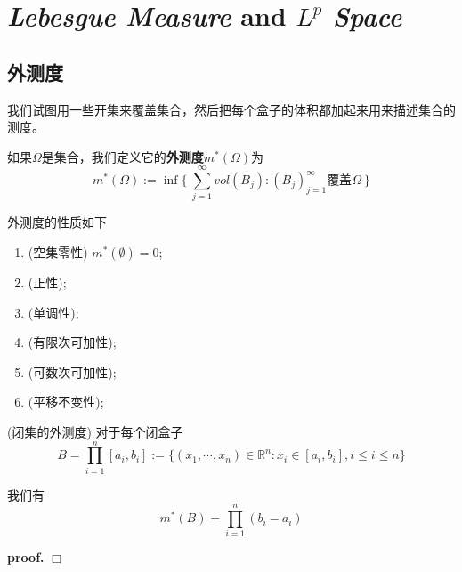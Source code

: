 \chapter{\textsl{Lebesgue Measure} and $L^p$ \textsl{Space}}

\section{外测度}

我们试图用一些开集来覆盖集合，然后把每个盒子的体积都加起来用来描述集合的测度。

\begin{mdframed}
    \begin{define}
        如果$\Omega$是集合，我们定义它的\textbf{外测度}$m^*(\Omega)$为
        \begin{equation}
            m^*(\Omega):=\inf\{\ \sum_{j=1}^{\infty}vol(B_j) : (B_j)_{j=1}^{\infty}\mbox{覆盖}\Omega \ \}
        \end{equation}
    \end{define}
\end{mdframed}

外测度的性质如下
\begin{enumerate}[itemindent=2em]
    \item (空集零性) $m^*(\emptyset)=0$;
    \item (正性);
    \item (单调性);
    \item (有限次可加性);
    \item (可数次可加性);
    \item (平移不变性);
\end{enumerate}

\begin{mdframed}
    \begin{proposition}
        (闭集的外测度) 对于每个闭盒子
        \begin{equation}
            B=\prod_{i=1}^{n}[a_i,b_i]:=\{(x_1,\cdots,x_n)\in \mathbb{R}^n:x_i\in [a_i,b_i],i\leqslant i\leqslant n\}
        \end{equation}

        我们有
        \begin{equation}
            m^*(B)=\prod_{i=1}^{n}(b_i-a_i)
        \end{equation}
    \end{proposition}
\end{mdframed}

\textbf{proof.} $\Box$

